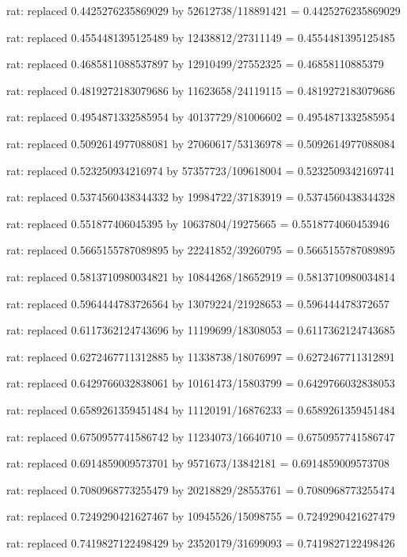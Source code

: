 \documentclass[a4paper,10pt]{article}
\begin{document}
\begin{eulernotebook}
\begin{eulercomment}
\begin{eulercomment}
\begin{eulercomment}
\begin{eulercomment}
\begin{eulercomment}
\begin{eulercomment}
\begin{eulercomment}
\begin{eulercomment}
\begin{eulercomment}
\begin{eulercomment}
\begin{eulercomment}
\begin{eulercomment}
\begin{eulercomment}
\begin{eulercomment}
\begin{eulercomment}
\begin{eulercomment}
\begin{euleroutput}
  rat: replaced 0.4425276235869029 by 52612738/118891421 = 0.4425276235869029
  
  rat: replaced 0.4554481395125489 by 12438812/27311149 = 0.4554481395125485
  
  rat: replaced 0.4685811088537897 by 12910499/27552325 = 0.46858110885379
  
  rat: replaced 0.4819272183079686 by 11623658/24119115 = 0.4819272183079686
  
  rat: replaced 0.4954871332585954 by 40137729/81006602 = 0.4954871332585954
  
  rat: replaced 0.5092614977088081 by 27060617/53136978 = 0.5092614977088084
  
  rat: replaced 0.523250934216974 by 57357723/109618004 = 0.5232509342169741
  
  rat: replaced 0.5374560438344332 by 19984722/37183919 = 0.5374560438344328
  
  rat: replaced 0.551877406045395 by 10637804/19275665 = 0.5518774060453946
  
  rat: replaced 0.5665155787089895 by 22241852/39260795 = 0.5665155787089895
  
  rat: replaced 0.5813710980034821 by 10844268/18652919 = 0.5813710980034814
  
  rat: replaced 0.5964444783726564 by 13079224/21928653 = 0.596444478372657
  
  rat: replaced 0.6117362124743696 by 11199699/18308053 = 0.6117362124743685
  
  rat: replaced 0.6272467711312885 by 11338738/18076997 = 0.6272467711312891
  
  rat: replaced 0.6429766032838061 by 10161473/15803799 = 0.6429766032838053
  
  rat: replaced 0.6589261359451484 by 11120191/16876233 = 0.6589261359451484
  
  rat: replaced 0.6750957741586742 by 11234073/16640710 = 0.6750957741586747
  
  rat: replaced 0.6914859009573701 by 9571673/13842181 = 0.6914859009573708
  
  rat: replaced 0.7080968773255479 by 20218829/28553761 = 0.7080968773255474
  
  rat: replaced 0.7249290421627467 by 10945526/15098755 = 0.7249290421627479
  
  rat: replaced 0.7419827122498429 by 23520179/31699093 = 0.7419827122498426
  

\end{euleroutput}
\end{eulercomment}
\end{eulercomment}
\end{eulercomment}
\end{eulercomment}
\end{eulercomment}
\end{eulercomment}
\end{eulercomment}
\end{eulercomment}
\end{eulercomment}
\end{eulercomment}
\end{eulercomment}
\end{eulercomment}
\end{eulercomment}
\end{eulercomment}
\end{eulercomment}
\end{eulercomment}
\end{eulernotebook}
\end{document}
